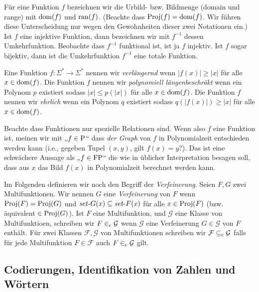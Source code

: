 Für eine Funktion $f$ bezeichnen wir die Urbild- bzw. Bildmenge (domain und range) mit $\dom(f)$ und $\ran(f)$. (Beachte dass $\Proj(f)=\dom(f)$. Wir führen diese Unterscheidung nur wegen den Gewohnheiten dieser zwei Notationen ein.) Ist $f$ eine injektive Funktion, dann bezeichnen wir mit $f^{-1}$ dessen Umkehrfunktion. Beobachte dass $f^{-1}$ funktional ist, ist ja $f$ injektiv. Ist $f$ sogar bijektiv, dann ist die Umkehrfunktion $f^{-1}$ eine totale Funktion.

Eine Funktion $f\colon\Sigma^*\to\Sigma^*$ nennen wir \emph{verlängernd} wenn $|f(x)|\geq |x|$ für alle $x\in\dom(f)$.
Die Funktion $f$ nennen wir \emph{polynomiell längenbeschräkt} wenn ein Polynom $p$ existiert sodass $|x|\leq p(|x|)$ für alle $x\in\dom(f)$.
Die Funktion $f$ nennen wir \emph{ehrlich} wenn ein Polynom $q$ existiert sodass $q(|f(x)|)\geq |x|$ für alle $x\in\dom(f)$.

Beachte dass Funktionen nur spezielle Relationen sind. Wenn also $f$ eine Funktion ist, meinen wir mit „$f\in\P$“ dass \emph{der Graph} von $f$ in Polynomialzeit entschieden werden kann (i.e., gegeben Tupel $(x, y)$, gilt $f(x)=y$?). Das ist eine schwächere Aussage als „$f\in\FP$“ die wie in üblicher Interpretation besagen soll, dass aus $x$ das Bild $f(x)$ in Polynomialzeit berechnet werden kann.

Im Folgenden definieren wir noch den Begriff der \emph{Verfeinerung}. Seien $F, G$ zwei Multifunktionen. Wir nennen $G$ eine \emph{Verfeinerung} von $F$ wenn $\Proj(F)=\Proj(G)$ und $\fset{}G(x)\subseteq \fset{}F(x)$ für alle $x\in\Proj(F)$ (bzw. äquivalent $\in \Proj(G)$).
Ist $F$ eine Multifunktion, und $\mathcal G$ eine Klasse von Multifunktioen, schreiben wir $F\inc \mathcal G$ wenn $\mathcal G$ eine Verfeinerung $G\in\mathcal G$ von $F$ enthält.
Für zwei Klassen $\mathcal F, \mathcal G$ von Multifunktionen schreiben wir $\mathcal F \subseteqc \mathcal G$ falls für jede Multifunktion $F\in\mathcal F$ auch $F\inc \mathcal G$ gilt.

\subsection*{Codierungen, Identifikation von Zahlen und Wörtern}

